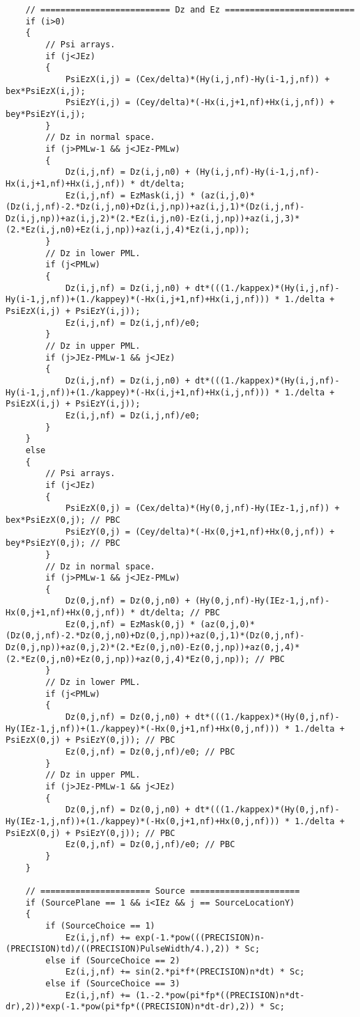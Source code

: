 \begin{lstlisting}
	// ========================== Dz and Ez ==========================
	if (i>0)
	{
		// Psi arrays.
		if (j<JEz)
		{
			PsiEzX(i,j) = (Cex/delta)*(Hy(i,j,nf)-Hy(i-1,j,nf)) + bex*PsiEzX(i,j);
			PsiEzY(i,j) = (Cey/delta)*(-Hx(i,j+1,nf)+Hx(i,j,nf)) + bey*PsiEzY(i,j);
		}
		// Dz in normal space.
		if (j>PMLw-1 && j<JEz-PMLw)
		{
			Dz(i,j,nf) = Dz(i,j,n0) + (Hy(i,j,nf)-Hy(i-1,j,nf)-Hx(i,j+1,nf)+Hx(i,j,nf)) * dt/delta;
			Ez(i,j,nf) = EzMask(i,j) * (az(i,j,0)*(Dz(i,j,nf)-2.*Dz(i,j,n0)+Dz(i,j,np))+az(i,j,1)*(Dz(i,j,nf)-Dz(i,j,np))+az(i,j,2)*(2.*Ez(i,j,n0)-Ez(i,j,np))+az(i,j,3)*(2.*Ez(i,j,n0)+Ez(i,j,np))+az(i,j,4)*Ez(i,j,np));
		}
		// Dz in lower PML.
		if (j<PMLw)
		{
			Dz(i,j,nf) = Dz(i,j,n0) + dt*(((1./kappex)*(Hy(i,j,nf)-Hy(i-1,j,nf))+(1./kappey)*(-Hx(i,j+1,nf)+Hx(i,j,nf))) * 1./delta + PsiEzX(i,j) + PsiEzY(i,j));
			Ez(i,j,nf) = Dz(i,j,nf)/e0;
		}
		// Dz in upper PML.
		if (j>JEz-PMLw-1 && j<JEz)
		{
			Dz(i,j,nf) = Dz(i,j,n0) + dt*(((1./kappex)*(Hy(i,j,nf)-Hy(i-1,j,nf))+(1./kappey)*(-Hx(i,j+1,nf)+Hx(i,j,nf))) * 1./delta + PsiEzX(i,j) + PsiEzY(i,j));
			Ez(i,j,nf) = Dz(i,j,nf)/e0;
		}
	}
	else
	{
		// Psi arrays.
		if (j<JEz)
		{
			PsiEzX(0,j) = (Cex/delta)*(Hy(0,j,nf)-Hy(IEz-1,j,nf)) + bex*PsiEzX(0,j); // PBC
			PsiEzY(0,j) = (Cey/delta)*(-Hx(0,j+1,nf)+Hx(0,j,nf)) + bey*PsiEzY(0,j); // PBC
		}
		// Dz in normal space.
		if (j>PMLw-1 && j<JEz-PMLw)
		{
			Dz(0,j,nf) = Dz(0,j,n0) + (Hy(0,j,nf)-Hy(IEz-1,j,nf)-Hx(0,j+1,nf)+Hx(0,j,nf)) * dt/delta; // PBC
			Ez(0,j,nf) = EzMask(0,j) * (az(0,j,0)*(Dz(0,j,nf)-2.*Dz(0,j,n0)+Dz(0,j,np))+az(0,j,1)*(Dz(0,j,nf)-Dz(0,j,np))+az(0,j,2)*(2.*Ez(0,j,n0)-Ez(0,j,np))+az(0,j,4)*(2.*Ez(0,j,n0)+Ez(0,j,np))+az(0,j,4)*Ez(0,j,np)); // PBC
		}
		// Dz in lower PML.
		if (j<PMLw)
		{
			Dz(0,j,nf) = Dz(0,j,n0) + dt*(((1./kappex)*(Hy(0,j,nf)-Hy(IEz-1,j,nf))+(1./kappey)*(-Hx(0,j+1,nf)+Hx(0,j,nf))) * 1./delta + PsiEzX(0,j) + PsiEzY(0,j)); // PBC
			Ez(0,j,nf) = Dz(0,j,nf)/e0; // PBC
		}
		// Dz in upper PML.
		if (j>JEz-PMLw-1 && j<JEz)
		{
			Dz(0,j,nf) = Dz(0,j,n0) + dt*(((1./kappex)*(Hy(0,j,nf)-Hy(IEz-1,j,nf))+(1./kappey)*(-Hx(0,j+1,nf)+Hx(0,j,nf))) * 1./delta + PsiEzX(0,j) + PsiEzY(0,j)); // PBC
			Ez(0,j,nf) = Dz(0,j,nf)/e0; // PBC
		}
	}

	// ====================== Source ======================
	if (SourcePlane == 1 && i<IEz && j == SourceLocationY)
	{
		if (SourceChoice == 1)
			Ez(i,j,nf) += exp(-1.*pow(((PRECISION)n-(PRECISION)td)/((PRECISION)PulseWidth/4.),2)) * Sc;
		else if (SourceChoice == 2)
			Ez(i,j,nf) += sin(2.*pi*f*(PRECISION)n*dt) * Sc;
		else if (SourceChoice == 3)
			Ez(i,j,nf) += (1.-2.*pow(pi*fp*((PRECISION)n*dt-dr),2))*exp(-1.*pow(pi*fp*((PRECISION)n*dt-dr),2)) * Sc;


\end{lstlisting}
